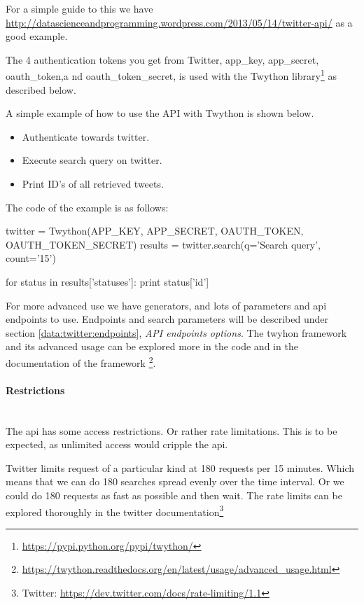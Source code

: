 For a simple guide to this we have
\url{http://datascienceandprogramming.wordpress.com/2013/05/14/twitter-api/} as
a good example.

The 4 authentication tokens you get from Twitter, app\_key, app\_secret, oauth\_token,a nd
oauth\_token\_secret, is used with the Twython
library\footnote{\url{https://pypi.python.org/pypi/twython/}} as described
below.

A simple example of how to use the API with Twython is shown below. 
\begin{itemize}
	\item Authenticate towards twitter.
	\item Execute search query on twitter.
	\item Print ID's of all retrieved tweets.
\end{itemize} 

The code of the example is as follows:
\begin{python}
twitter = Twython(APP_KEY, APP_SECRET, OAUTH_TOKEN, OAUTH_TOKEN_SECRET)
results = twitter.search(q='Search query', count='15')

for status in results['statuses']:
    print status['id']
\end{python}

For more advanced use we have generators, and lots of parameters and api
endpoints to use. Endpoints and search parameters will be described under
section \ref{data:twitter:endpoints}, \textit{API endpoints options}. 
The twyhon framework and its advanced usage can be explored more in the code and
in the documentation of the framework
\footnote{\url{https://twython.readthedocs.org/en/latest/usage/advanced_usage.html}}.
%

\paragraph{Restrictions}
\hspace{0pt}\\
The api has some access restrictions. Or rather rate limitations. This is to be
expected, as unlimited access would cripple the api.

Twitter limits request of a particular kind at 180 requests per 15 minutes.
Which means that we can do 180 searches spread evenly over the time interval. Or
we could do 180 requests as fast as possible and then wait. The rate limits can
be explored thoroughly in the twitter documentation\footnote{Twitter:
\url{https://dev.twitter.com/docs/rate-limiting/1.1}}

